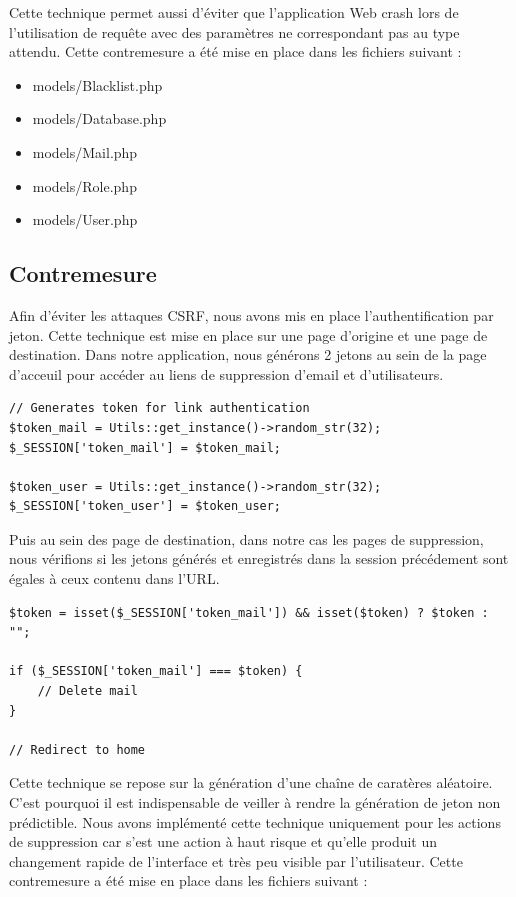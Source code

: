 \documentclass[12pt]{article}
\begin{document}
Cette technique permet aussi d'éviter que l'application Web crash lors de l'utilisation de requête avec des paramètres ne correspondant pas au type attendu.
Cette contremesure a été mise en place dans les fichiers suivant :

\begin{itemize}
\item models/Blacklist.php
\item models/Database.php
\item models/Mail.php
\item models/Role.php
\item models/User.php
\end{itemize}

\newpage
\subsection{Contremesure}\label{c4_1}

Afin d'éviter les attaques CSRF, nous avons mis en place l'authentification par jeton. Cette technique est mise en place sur une page d'origine et une page de destination.
Dans notre application, nous générons 2 jetons au sein de la page d'acceuil pour accéder au liens de suppression d'email et d'utilisateurs.

\begin{lstlisting}[style=JAVA]
// Generates token for link authentication
$token_mail = Utils::get_instance()->random_str(32);
$_SESSION['token_mail'] = $token_mail;

$token_user = Utils::get_instance()->random_str(32);
$_SESSION['token_user'] = $token_user;
\end{lstlisting}

Puis au sein des page de destination, dans notre cas les pages de suppression, nous vérifions si les jetons générés et enregistrés dans la session précédement sont égales à ceux contenu dans l'URL.

\begin{lstlisting}[style=JAVA]
$token = isset($_SESSION['token_mail']) && isset($token) ? $token : "";

if ($_SESSION['token_mail'] === $token) {
    // Delete mail
}

// Redirect to home
\end{lstlisting}

Cette technique se repose sur la génération d'une chaîne de caratères aléatoire. C'est pourquoi il est indispensable de veiller à rendre la génération de jeton non prédictible. Nous avons implémenté cette technique uniquement pour les actions de suppression car s'est une action à haut risque et qu'elle produit un changement rapide de l'interface et très peu visible par l'utilisateur. 
Cette contremesure a été mise en place dans les fichiers suivant :
\end{document}
